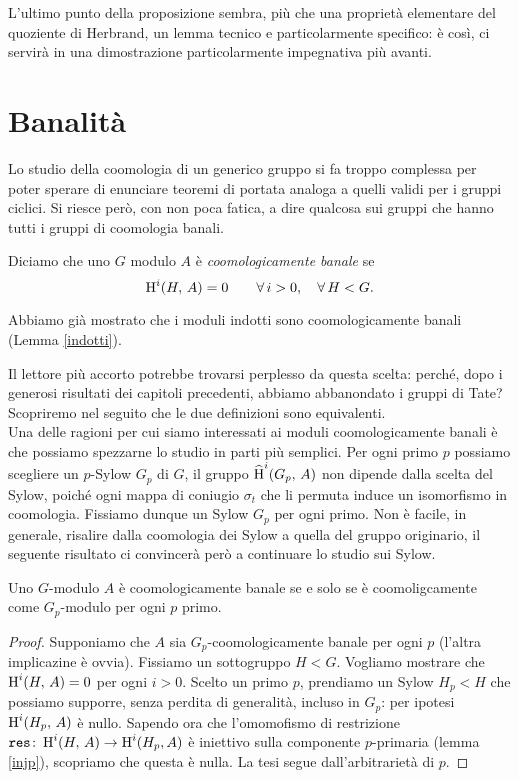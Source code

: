L'ultimo punto della proposizione sembra, più che una proprietà elementare del quoziente di Herbrand, un lemma tecnico e particolarmente specifico: è così, ci servirà in una dimostrazione particolarmente impegnativa più avanti.

\section{Banalità}
Lo studio della coomologia di un generico gruppo si fa troppo complessa per poter sperare di enunciare teoremi di portata analoga a quelli validi per i gruppi ciclici. Si riesce però, con non poca fatica, a dire qualcosa sui gruppi che hanno tutti i gruppi di coomologia banali.

\begin{definition}
	Diciamo che uno $ G $ modulo $ A $ è \emph{coomologicamente banale} se
	$$  \operatorname{H}^i(H, \, A) = 0 \qquad \forall \, i > 0, \quad  \forall \, H < G.  $$
\end{definition}

\begin{example}
	Abbiamo già mostrato che i moduli indotti sono coomologicamente banali (Lemma \ref{indotti}).
\end{example}

Il lettore più accorto potrebbe trovarsi perplesso da questa scelta: perché, dopo i generosi risultati dei capitoli precedenti, abbiamo abbanondato i gruppi di Tate? Scopriremo nel seguito che le due definizioni sono equivalenti. \\

Una delle ragioni per cui siamo interessati ai moduli coomologicamente banali è che possiamo spezzarne lo studio in parti più semplici. Per ogni primo $ p $ possiamo scegliere un $ p $-Sylow $ G_p $ di $ G $, il gruppo $ \operatorname{\widehat{H}}^i(G_p, \, A) $ non dipende dalla scelta del Sylow, poiché ogni mappa di coniugio $ \sigma_t $ che li permuta induce un isomorfismo in coomologia. Fissiamo dunque un Sylow $ G_p $ per ogni primo. Non è facile, in generale, risalire dalla coomologia dei Sylow a quella del gruppo originario, il seguente risultato ci convincerà però a continuare lo studio sui Sylow.

\begin{lemma}
	Uno $ G $-modulo $ A $ è coomologicamente banale se e solo se è coomoligcamente come $ G_p $-modulo per ogni $ p $ primo.
\end{lemma}
\begin{proof}
	Supponiamo che $ A $ sia $ G_p $-coomologicamente banale per ogni $ p $ (l'altra implicazine è ovvia). Fissiamo un sottogruppo $ H < G $. Vogliamo mostrare che
	$  \operatorname{H}^i(H, \, A) = 0 $ per ogni $ i > 0 $. Scelto un primo $ p $, prendiamo un Sylow $ H_p < H $ che possiamo supporre, senza perdita di generalità, incluso in $ G_p $: per ipotesi $ \operatorname{H}^i(H_p, \, A) $ è nullo.
	Sapendo ora che l'omomofismo di restrizione $ \operatorname{\mathtt{res}} \colon \operatorname{H}^i(H, \, A) \to \operatorname{H}^i(H_p, A) $ è iniettivo sulla componente $ p $-primaria (lemma \ref{injp}), scopriamo che questa è nulla. La tesi segue dall'arbitrarietà di $ p $.
	
\end{proof}


